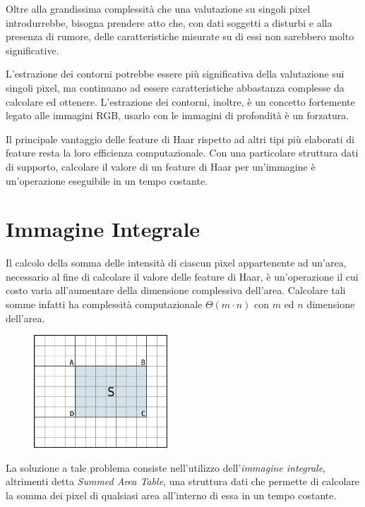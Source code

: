             Oltre alla grandissima complessità che una valutazione su singoli pixel introdurrebbe, bisogna prendere atto che, con dati soggetti a disturbi e alla presenza di rumore, delle caratteristiche misurate su di essi non sarebbero molto significative.

            L'estrazione dei contorni potrebbe essere più significativa della valutazione sui singoli pixel, ma continuano ad essere caratteristiche abbastanza complesse da calcolare ed ottenere.
            L'estrazione dei contorni, inoltre, è un concetto fortemente legato alle immagini RGB, usarlo con le immagini di profondità è un forzatura.

            Il principale vantaggio delle feature di Haar rispetto ad altri tipi più elaborati di feature resta la loro efficienza computazionale.
            Con una particolare struttura dati di supporto, calcolare il valore di un feature di Haar per un'immagine è un'operazione eseguibile in un tempo costante.
            
    \section{Immagine Integrale}
    \label{sec:integral_image}
        Il calcolo della somma delle intensità di ciascun pixel appartenente ad un'area, necessario al fine di calcolare il valore delle feature di Haar, è un'operazione il cui costo varia all'aumentare della dimensione complessiva dell'area.
        Calcolare tali somme infatti ha complessità computazionale $\Theta(m \cdot n)$ con $m$ ed $n$ dimensione dell'area.

        \begin{figure}
            \centering
            \includegraphics[width=5cm]{img/integral_image_sum.png}
            \caption{}
            \label{fig:integral_image_sum}
        \end{figure}

        La soluzione a tale problema consiste nell'utilizzo dell'\emph{immagine integrale}, altrimenti detta \emph{Summed Area Table}, una struttura dati che permette di calcolare la somma dei pixel di qualsiasi area all'interno di essa in un tempo costante.

